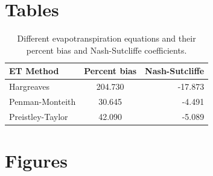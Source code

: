 \section{Tables}

\begin{landscape}

\end{landscape}








\begin{table}[h!]
	\caption[Different evapotranspiration equations ]{Different evapotranspiration equations and their percent bias and Nash-Sutcliffe coefficients.}
	\centering
	\begin{tabular}{ l c r }
		\hline
		ET Method         &	Percent bias & Nash-Sutcliffe \\
		\hline	\hline
		Hargreaves        &	204.730	& 	-17.873	\\
		Penman-Monteith	  &	30.645	&	-4.491 	\\
		Preistley-Taylor  &	42.090	&	-5.089 	\\
		\hline
	\end{tabular}
	\label{table:et_method}
\end{table}	

\begin{landscape}
	
	
\end{landscape}
\section{Figures}

